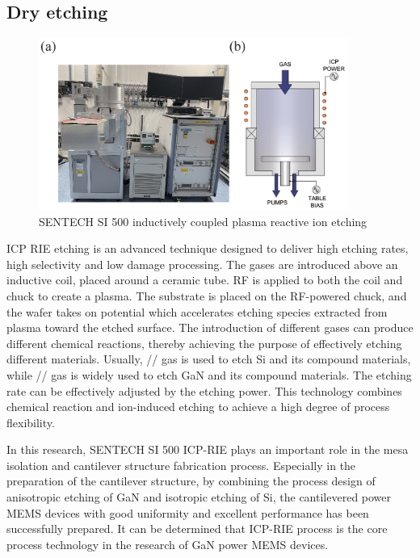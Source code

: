 \subsection{Dry etching}

\begin{figure}[H] 
\centering    
\includegraphics[width=0.9\textwidth]{icp}
\caption[SENTECH SI 500 inductively coupled plasma reactive ion etching]{SENTECH SI 500 inductively coupled plasma reactive ion etching}
\label{fig:icp}
\end{figure}


ICP RIE etching  is an advanced technique designed to deliver high etching rates, high selectivity and low damage processing. The gases are introduced above an inductive coil, placed around a ceramic tube. RF is applied to both the coil and chuck to create a plasma. The substrate is placed on the RF-powered chuck, and the wafer takes on potential which accelerates etching species extracted from plasma toward the etched surface. The introduction of different gases can produce different chemical reactions, thereby achieving the purpose of effectively etching different materials. Usually, // gas is used to etch Si and its compound materials, while // gas is widely used to etch GaN and its compound materials. The etching rate can be effectively adjusted by the etching power. This technology combines chemical reaction and ion-induced etching to achieve a high degree of process flexibility. 

In this research, SENTECH SI 500 ICP-RIE plays an important role in the mesa isolation and cantilever  structure fabrication process. Especially in the preparation of the cantilever structure, by combining the process design of anisotropic etching  of GaN and isotropic etching  of Si, the cantilevered  power MEMS devices with good uniformity and excellent performance has been successfully prepared. It can be determined that ICP-RIE process is the core process technology in the research of GaN power MEMS devices.


